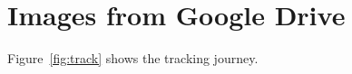 \documentclass[12pt,a4paper]{article}
\begin{document}
\section{Images from Google Drive}

\begin{urlfigure}
    \caption{Tracking Journey}
    \label{fig:track}
\end{urlfigure}

Figure~\ref{fig:track} shows the tracking journey.
\end{document}
